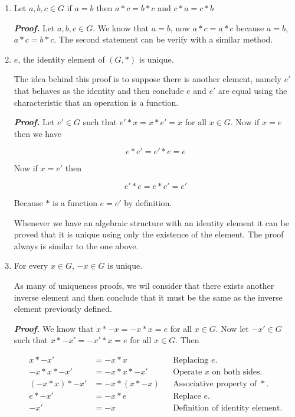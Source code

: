 \documentclass{report}
\begin{document}
    \begin{enumerate}
        \item Let $a, b, c \in G$ if $a = b$ then $a*c=b*c$ and $c*a=c*b$

        \textit{\textbf{Proof.}} Let $a, b, c \in G$. We know that $a=b$, now $a*c = a*c$ because $a=b$, $a*c=b*c$. The second statement can be verify with a similar method.
        \item $e$, the identity element of $(G, *)$ is unique.

        \begin{ideaBox}
            The idea behind this proof is to suppose there is another element, namely $e'$ that behaves as the identity and then conclude $e$ and $e'$ are equal using the characteristic that an operation is a function.
        \end{ideaBox}

        \textit{\textbf{Proof.}} Let $e' \in G$ such that $e'*x = x*e' = x$ for all $x \in G$. Now if $x = e$ then we have

        $$
            e*e'=e'*e=e
        $$

        Now if $x = e'$ then

        $$
            e'*e=e*e'=e'
        $$

        Because $*$ is a function $e=e'$ by definition.

        \begin{noteBox}
            Whenever we have an algebraic structure with an identity element it can be proved that it is unique using only the existence of the element. The proof always is similar to the one above.
        \end{noteBox}

        \item For every $x \in G$, $-x \in G$ is unique.

        \begin{ideaBox}
            As many of uniqueness proofs, we wil consider that there exists another inverse element and then conclude that it must be the same as the inverse element previously defined.
        \end{ideaBox}

        \textit{\textbf{Proof.}} We know that $x * -x = -x * x = e$ for all $x\in G$. Now let $-x' \in G$ such that $x * -x' = -x' * x = e$ for all $x \in G$. Then

        \begin{align*}
            x* -x' &= -x*x &&\text{Replacing } e.\\
            -x*x*-x' &= -x*x*-x' &&\text{Operate } x \text{ on both sides.}\\
            (-x*x)*-x'&=-x*(x*-x) &&\text{Associative property of } *.\\
            e*-x' &= -x *e &&\text{Replace }e.\\
            -x' &= -x &&\text{Definition of identity element.}
        \end{align*}


\end{enumerate}
\end{document}
